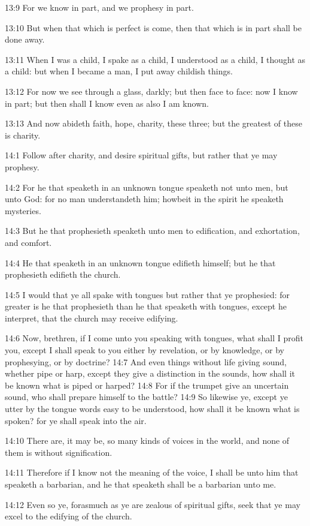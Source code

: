 13:9 For we know in part, and we prophesy in part.

13:10 But when that which is perfect is come, then that which is in part shall be done away.

13:11 When I was a child, I spake as a child, I understood as a child, I thought as a child: but when I became a man, I put away childish things.

13:12 For now we see through a glass, darkly; but then face to face: now I know in part; but then shall I know even as also I am known.

13:13 And now abideth faith, hope, charity, these three; but the greatest of these is charity.

14:1 Follow after charity, and desire spiritual gifts, but rather that ye may prophesy.

14:2 For he that speaketh in an unknown tongue speaketh not unto men, but unto God: for no man understandeth him; howbeit in the spirit he speaketh mysteries.

14:3 But he that prophesieth speaketh unto men to edification, and exhortation, and comfort.

14:4 He that speaketh in an unknown tongue edifieth himself; but he that prophesieth edifieth the church.

14:5 I would that ye all spake with tongues but rather that ye prophesied: for greater is he that prophesieth than he that speaketh with tongues, except he interpret, that the church may receive edifying.

14:6 Now, brethren, if I come unto you speaking with tongues, what shall I profit you, except I shall speak to you either by revelation, or by knowledge, or by prophesying, or by doctrine?  14:7 And even things without life giving sound, whether pipe or harp, except they give a distinction in the sounds, how shall it be known what is piped or harped?  14:8 For if the trumpet give an uncertain sound, who shall prepare himself to the battle?  14:9 So likewise ye, except ye utter by the tongue words easy to be understood, how shall it be known what is spoken? for ye shall speak into the air.

14:10 There are, it may be, so many kinds of voices in the world, and none of them is without signification.

14:11 Therefore if I know not the meaning of the voice, I shall be unto him that speaketh a barbarian, and he that speaketh shall be a barbarian unto me.

14:12 Even so ye, forasmuch as ye are zealous of spiritual gifts, seek that ye may excel to the edifying of the church.

